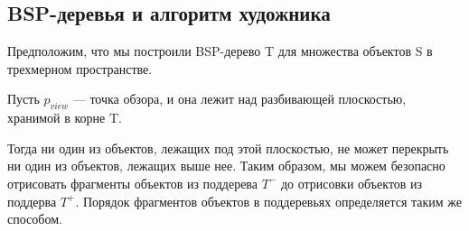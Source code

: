 \subsection*{BSP-деревья и алгоритм художника}

Предположим, что мы построили BSP-дерево T
для множества объектов S в трехмерном пространстве. 

Пусть $p_{view}$
— точка обзора, и она лежит над разбивающей плоскостью, хранимой в корне T.

Тогда ни один из объектов, лежащих под этой плоскостью, не может перекрыть ни один из объектов, лежащих выше нее. 
Таким образом, мы можем безопасно отрисовать фрагменты объектов из поддерева $T^-$ до отрисовки объектов из поддерва $T^+$. 
Порядок фрагментов объектов в поддеревьях определяется таким же способом.


